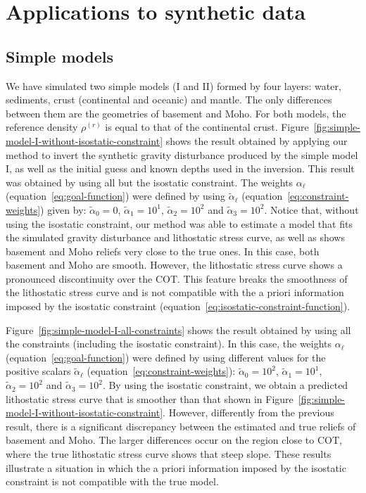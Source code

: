\documentclass[manuscript]{geophysics}
\begin{document}
\section{Applications to synthetic data}


\subsection{Simple models}

We have simulated two simple models (I and II) formed by four layers: water, sediments,
crust (continental and oceanic) and mantle.
The only differences between them are the geometries of basement and Moho.
For both models, the reference density $\rho^{(r)}$ is equal to that of the
continental crust.
Figure~\ref{fig:simple-model-I-without-isostatic-constraint} 
shows the result obtained by applying 
our method to invert the synthetic gravity disturbance produced by the simple model I,
as well as the initial guess and known depths used in the inversion.
This result was obtained by using all but the isostatic constraint.
The weights $\alpha_{\ell}$ (equation~\ref{eq:goal-function}) were defined
by using $\tilde{\alpha}_{\ell}$ (equation~\ref{eq:constraint-weights}) given by: 
$\tilde{\alpha}_{0} = 0$, $\tilde{\alpha}_{1} = 10^{1}$, 
$\tilde{\alpha}_{2} = 10^{2}$ and $\tilde{\alpha}_{3} = 10^{2}$.
Notice that, without using the isostatic constraint, our method was able
to estimate a model that fits the simulated gravity disturbance and 
lithostatic stress curve, as well as shows basement and Moho reliefs 
very close to the true ones.
In this case, both basement and Moho are smooth. However,
the lithostatic stress curve shows a pronounced discontinuity over the COT. 
This feature breaks the smoothness of the lithostatic stress curve and 
is not compatible with the a priori information imposed by
the isostatic constraint (equation~\ref{eq:isostatic-constraint-function}).

Figure~\ref{fig:simple-model-I-all-constraints} shows the result
obtained by using all the constraints (including the isostatic constraint).
In this case, the weights $\alpha_{\ell}$ (equation~\ref{eq:goal-function}) 
were defined by using different values for the positive scalars 
$\tilde{\alpha}_{\ell}$ (equation~\ref{eq:constraint-weights}): 
$\tilde{\alpha}_{0} = 10^{2}$, $\tilde{\alpha}_{1} = 10^{1}$, 
$\tilde{\alpha}_{2} = 10^{2}$ and $\tilde{\alpha}_{3} = 10^{2}$.
By using the isostatic constraint, we obtain a predicted 
lithostatic stress curve that is smoother than that shown in 
Figure~\ref{fig:simple-model-I-without-isostatic-constraint}. 
However, differently from the previous result, there is a significant 
discrepancy between the estimated and true reliefs of basement and Moho.
The larger differences occur on the region close to COT, where the 
true lithostatic stress curve shows that steep slope.
These results illustrate a situation in which the a priori information
imposed by the isostatic constraint is not compatible with the 
true model.
\end{document}
